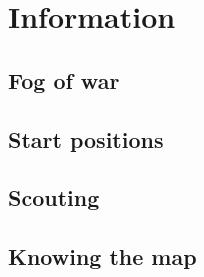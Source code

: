 \section{Information}
\subsection{Fog of war}
\subsection{Start positions}
\subsection{Scouting}
\subsection{Knowing the map}
